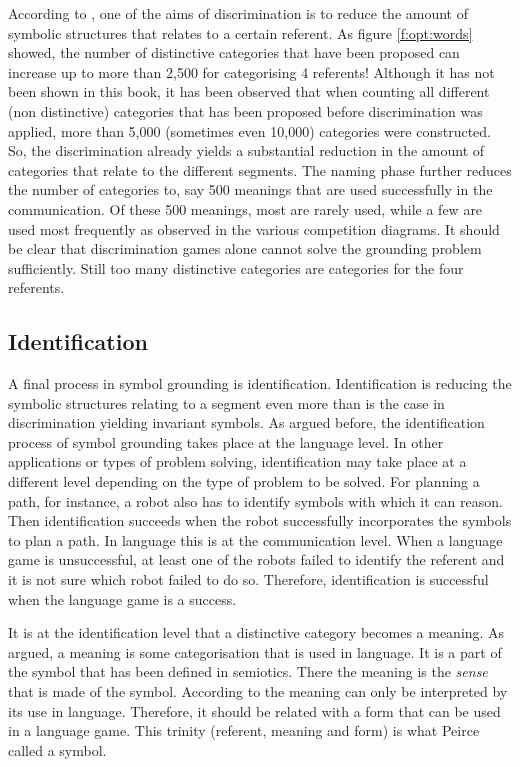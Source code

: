 According to \citet{harnad:1990}, one of the aims of discrimination is to reduce the amount of symbolic structures that relates to a certain referent. As figure \ref{f:opt:words} showed, the number of distinctive categories that have been proposed can increase up to more than 2,500 for categorising 4 referents! Although it has not been shown in this book, it has been observed that when counting all different (non distinctive) categories that has been proposed before discrimination was applied, more than 5,000 (sometimes even 10,000) categories were constructed. So, the discrimination already yields a substantial reduction in the amount of categories that relate to the different segments. The naming phase further reduces the number of categories to, say 500 meanings that are used successfully in the communication. Of these 500 meanings, most are rarely used, while a few are used most frequently as observed in the various competition diagrams. It should be clear that  discrimination games alone cannot solve the grounding problem sufficiently. Still too many distinctive categories are categories for the four referents.

\subsection{Identification}

A final process in symbol grounding is identification. Identification is reducing the symbolic structures relating to a segment even more than is the case in discrimination yielding invariant symbols. As argued before, the identification process of symbol grounding takes place at the language level. In other applications or types of problem solving, identification may take place at a different level depending on the type of problem to be solved. For planning a path, for instance, a robot also has to identify symbols with which it can reason. Then identification succeeds when the robot successfully incorporates the symbols to plan a path. In language this is at the communication level. When a language game is unsuccessful, at least one of the robots failed to identify the referent and it is not sure which robot failed to do so. Therefore, identification is successful when the language game is a success.

It is at the identification level that a distinctive category becomes a meaning. As argued, a meaning is some categorisation that is used in language. It is a part of the symbol that has been defined in semiotics. There the meaning is the {\em sense} that is made of the symbol. According to \citet{wittgenstein:1958} the meaning can only be interpreted by its use in language. Therefore, it should be related with a form that can be used in a language game. This trinity (referent, meaning and form) is what Peirce called a symbol. 

